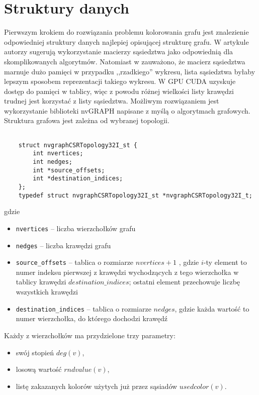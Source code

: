 \documentclass{article}
\begin{document}
	\section{Struktury danych}
	Pierwszym krokiem do rozwiązania problemu kolorowania grafu jest znalezienie odpowiedniej struktury danych najlepiej opisującej strukturę grafu. W artykule \cite{Shen2017} autorzy sugerują wykorzystanie macierzy sąsiedztwa jako odpowiednią dla skomplikowanych algorytmów. Natomiast w \cite{SINGH20155} zauważono, że macierz sąsiedztwa marnuje dużo pamięci w przypadku ,,rzadkiego'' wykresu, lista sąsiedztwa byłaby lepszym sposobem reprezentacji takiego wykresu. W GPU CUDA uzyskuje dostęp do pamięci w tablicy, więc z powodu różnej wielkości listy krawędzi trudnej jest korzystać z listy sąsiedztwa. Możliwym rozwiązaniem jest wykorzystanie biblioteki nvGRAPH napisane z myślą o algorytmach grafowych. Struktura grafowa jest zależna od wybranej topologii.
	\begin{lstlisting}
	
	struct nvgraphCSRTopology32I_st {
		int nvertices;
		int nedges;
		int *source_offsets;
		int *destination_indices;
	};
	typedef struct nvgraphCSRTopology32I_st *nvgraphCSRTopology32I_t;
	\end{lstlisting}
	gdzie
	\begin{itemize}
		\itemsep0em
		\item \texttt{nvertices} -- liczba wierzchołków grafu
		\item \texttt{nedges} -- liczba krawędzi grafu
		\item \texttt{source\_offsets} -- tablica o rozmiarze $nvertices+1$ , gdzie $i$-ty element to numer indeksu pierwszej z krawędzi wychodzących z tego wierzchołka w tablicy krawędzi $destination\_indices$; ostatni element przechowuje liczbę wszystkich krawędzi
		\item \texttt{destination\_indices} -- tablica o rozmiarze $nedges$, gdzie każda wartość to numer wierzchołka, do którego dochodzi krawędź
	\end{itemize}
	
	
	Każdy z wierzchołków ma przydzielone trzy parametry:
	\begin{itemize}
		\itemsep0em
		\item swój stopień $deg(v)$,
		\item losową wartość $rndvalue(v)$, 
		\item listę zakazanych kolorów użytych już przez sąsiadów $usedcolor(v)$. 
	\end{itemize} 
	
\end{document}
